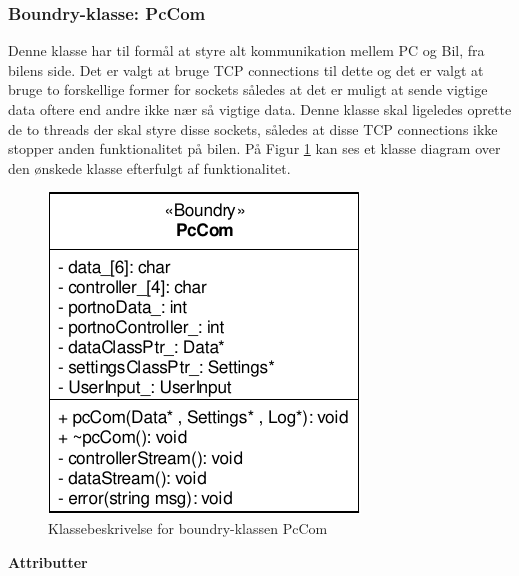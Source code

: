\subsubsection{Boundry-klasse: PcCom}

Denne klasse har til formål at styre alt kommunikation mellem PC og Bil, fra bilens side. Det er valgt at bruge TCP connections til dette og det er valgt at bruge to forskellige former for sockets således at det er muligt at sende vigtige data oftere end andre ikke nær så vigtige data. Denne klasse skal ligeledes oprette de to threads der skal styre disse sockets, således at disse TCP connections ikke stopper anden funktionalitet på bilen. På Figur \ref{fig:cd_pccom} kan ses et klasse diagram over den ønskede klasse efterfulgt af funktionalitet.

\begin{figure}[h]
\centering
\includegraphics[]{../fig/diagrammer/bil/cd_pccom.pdf}
\caption{Klassebeskrivelse for boundry-klassen PcCom}
\label{fig:cd_pccom}
\end{figure}

\textbf{Attributter}

